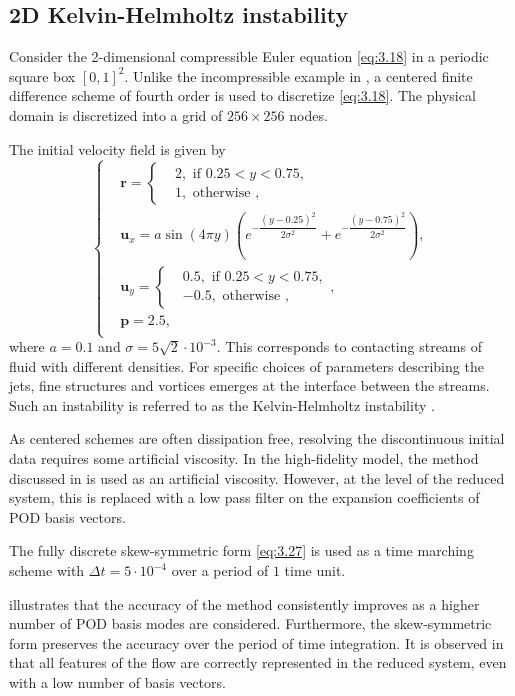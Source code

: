 \subsection{2D Kelvin-Helmholtz instability}
Consider the 2-dimensional compressible Euler equation \eqref{eq:3.18} in a periodic square box $[0,1]^2$. Unlike the incompressible example in , a centered finite difference scheme of fourth order is used to discretize \eqref{eq:3.18}. The physical domain is discretized into a grid of $256\times 256$ nodes.

The initial velocity field is given by
\begin{equation*}
\begin{cases}
& \mathbf{r} = 
\begin{cases}
& 2, \text{ if } 0.25<y<0.75,\\
& 1, \text{ otherwise },
\end{cases}
\\
& \mathbf{u}_x = a \sin(4\pi y) \left( e^{-\dfrac{(y-0.25)^2}{2\sigma^2}} + e^{-\dfrac{(y-0.75)^2}{2\sigma^2}} \right),\\
& \mathbf{u}_y = 
\begin{cases}
& 0.5, \text{ if } 0.25<y<0.75,\\
& -0.5, \text{ otherwise },
\end{cases},
\\
& \mathbf{p} = 2.5,\\
\end{cases}
\end{equation*}
where $a=0.1$ and $\sigma=5\sqrt{2}\cdot 10^{-3}$. This corresponds to contacting streams of fluid with different densities. For specific choices of parameters describing the jets, fine structures and vortices emerges at the interface between the streams. Such an instability is referred to as the Kelvin-Helmholtz instability \cite{HHS}.

As centered schemes are often dissipation free, resolving the discontinuous initial data requires some artificial viscosity. In the high-fidelity model, the method discussed in \cite{artificial_dissipation} is used as an artificial viscosity. However, at the level of the reduced system, this is replaced with a low pass filter on the expansion coefficients of POD basis vectors.

The fully discrete skew-symmetric form \eqref{eq:3.27} is used as a time marching scheme with $\Delta t = 5 \cdot 10^{-4}$ over a period of $1$ time unit.

 illustrates that the accuracy of the method consistently improves as a higher number of POD basis modes are considered. Furthermore, the skew-symmetric form preserves the accuracy over the period of time integration. It is observed in  that all features of the flow are correctly represented in the reduced system, even with a low number of basis vectors.

